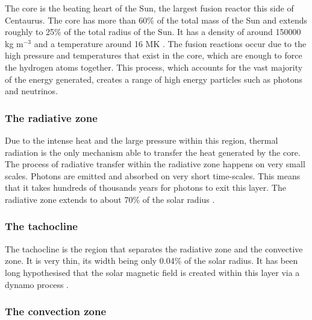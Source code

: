     The core is the beating heart of the Sun, the largest fusion reactor this side of Centaurus.
    The core has more than 60\% of the total mass of the Sun and extends roughly to 25\% of the total radius of the Sun.
    It has a density of around 150000 kg m$^{-3}$ and a temperature around 16 MK \citep{0004-637X-699-2-1403}.
    The fusion reactions occur due to the high pressure and temperatures that exist in the core, which are enough to force the hydrogen atoms together. 
    This process, which accounts for the vast majority of the energy generated, creates a range of high energy particles such as photons and neutrinos.
    
\subsubsection{The radiative zone}

    Due to the intense heat and the large pressure within this region, thermal radiation is the only mechanism able to transfer the heat generated by the core.
    The process of radiative transfer within the radiative zone happens on very small scales.
    Photons are emitted and absorbed on very short time-scales. 
    This means that it takes hundreds of thousands years for photons to exit this layer.
    The radiative zone extends to about 70\% of the solar radius \citep{cox1991solar}. 
        
\subsubsection{The tachocline}

    The tachocline is the region that separates the radiative zone and the convective zone.
    It is very thin, its width being only 0.04\% of the solar radius.
    It has been long hypothesised that the solar magnetic field is created within this layer via a dynamo process \citep{soward2005fluid}.

\subsubsection{The convection zone}

